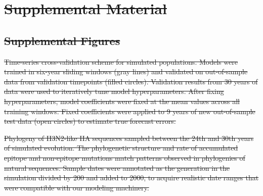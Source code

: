 \documentclass[9pt,lineno]{elife} %
\providecommand{\DIFdel}[1]{{\protect\color{red}\sout{#1}}}                      %
\providecommand{\DIFdelFL}[1]{\DIFdel{#1}} %
\providecommand{\DIFdeltex}[1]{{\protect\color{red}\sout{#1}}}                      %
\providecommand{\DIFdelFL}[1]{\DIFdel{#1}} %
\providecommand{\DIFdel}[1]{\texorpdfstring{\DIFdeltex{#1}}{}} %
\begin{document}

\section*{\DIFdel{Supplemental Material}}

\subsection*{\DIFdel{Supplemental Figures}}

{%
\DIFdelFL{Time-series cross-validation scheme for simulated populations.
  Models were trained in six-year sliding windows (gray lines) and validated on out-of-sample data from validation timepoints (filled circles).
  Validation results from 30 years of data were used to iteratively tune model hyperparameters.
  After fixing hyperparameters, model coefficients were fixed at the mean values across all training windows.
  Fixed coefficients were applied to 9 years of new out-of-sample test data (open circles) to estimate true forecast errors.
  }}

{%
\DIFdelFL{Phylogeny of H3N2-like HA sequences sampled between the 24th and 30th years of simulated evolution.
  The phylogenetic structure and rate of accumulated epitope and non-epitope mutations match patterns observed in phylogenies of natural sequences.
  Sample dates were annotated as the generation in the simulation divided by 200 and added to 2000, to acquire realistic date ranges that were compatible with our modeling machinery.
  }}
\end{document}
